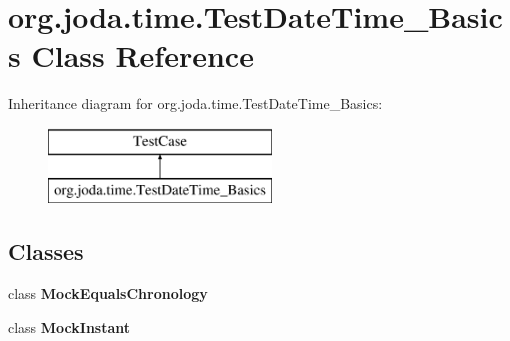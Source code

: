 \hypertarget{classorg_1_1joda_1_1time_1_1_test_date_time___basics}{\section{org.\-joda.\-time.\-Test\-Date\-Time\-\_\-\-Basics Class Reference}
\label{classorg_1_1joda_1_1time_1_1_test_date_time___basics}
}
Inheritance diagram for org.\-joda.\-time.\-Test\-Date\-Time\-\_\-\-Basics\-:\begin{figure}[H]
\begin{center}
\leavevmode
\includegraphics[height=2.000000cm]{classorg_1_1joda_1_1time_1_1_test_date_time___basics}
\end{center}
\end{figure}
\subsection*{Classes}
\begin{DoxyCompactItemize}
\item 
class {\bfseries Mock\-Equals\-Chronology}
\item 
class {\bfseries Mock\-Instant}
\end{DoxyCompactItemize}
